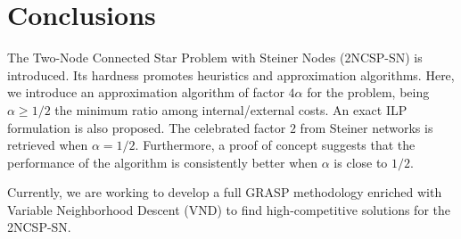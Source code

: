 \documentclass{endm}
\begin{document}
\clearpage 
\section{Conclusions}\label{Conclusions}
The Two-Node Connected Star Problem with Steiner Nodes (2NCSP-SN) is introduced.
Its hardness promotes heuristics and approximation algorithms.
Here, we introduce an approximation algorithm of factor $4\alpha$ for the problem,
being $\alpha \geq 1/2$ the minimum ratio among internal/external costs.
An exact ILP formulation is also proposed.
The celebrated factor $2$ from Steiner networks is retrieved when $\alpha=1/2$.
Furthermore, a proof of concept suggests that the performance of the algorithm is consistently
better when $\alpha$ is close to $1/2$.

Currently, we are working to develop a full GRASP methodology enriched with Variable Neighborhood Descent (VND) to find high-competitive solutions for the 2NCSP-SN.
\end{document}
